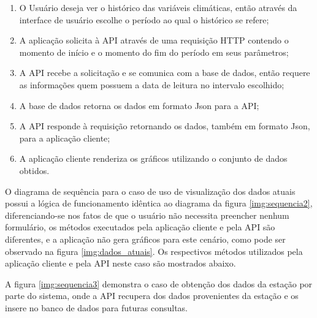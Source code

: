 \begin{enumerate}
	\item O Usuário deseja ver o histórico das variáveis climáticas, então através da interface de usuário escolhe o período ao qual o histórico se refere;
	\item A aplicação solicita à API através de uma requisição HTTP contendo o momento de início e o momento do fim do período em seus parâmetros;     			\item A API recebe a solicitação e se comunica com a base de dados, então requere as informações quem possuem a data de leitura no intervalo escolhido;
	\item A base de dados retorna os dados em formato Json para a API;
	\item A API responde à requisição retornando os dados, também em formato Json, para a aplicação cliente;
	\item A aplicação cliente renderiza os gráficos utilizando o conjunto de dados obtidos.
\end{enumerate}

O diagrama de sequência para o caso de uso de visualização dos dados atuais possui a lógica de funcionamento idêntica ao diagrama da figura \ref{img:sequencia2}, diferenciando-se nos fatos de que o usuário não necessita preencher nenhum formulário, os métodos executados pela aplicação cliente e pela API são diferentes, e a aplicação não gera gráficos para este cenário, como pode ser observado na figura \ref{img:dados_atuais}. Os respectivos métodos utilizados pela aplicação cliente e pela API neste caso são mostrados abaixo.



A figura \ref{img:sequencia3} demonstra o caso de obtenção dos dados da estação por parte do sistema, onde a API recupera dos dados provenientes da estação e os insere no banco de dados para futuras consultas.



